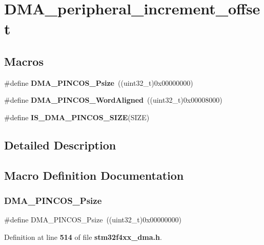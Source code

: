 \section{D\+M\+A\+\_\+peripheral\+\_\+increment\+\_\+offset}
\label{group__DMA__peripheral__increment__offset}
\subsection*{Macros}
\begin{DoxyCompactItemize}
\item 
\#define \textbf{ D\+M\+A\+\_\+\+P\+I\+N\+C\+O\+S\+\_\+\+Psize}~((uint32\+\_\+t)0x00000000)
\item 
\#define \textbf{ D\+M\+A\+\_\+\+P\+I\+N\+C\+O\+S\+\_\+\+Word\+Aligned}~((uint32\+\_\+t)0x00008000)
\item 
\#define \textbf{ I\+S\+\_\+\+D\+M\+A\+\_\+\+P\+I\+N\+C\+O\+S\+\_\+\+S\+I\+ZE}(S\+I\+ZE)
\end{DoxyCompactItemize}


\subsection{Detailed Description}


\subsection{Macro Definition Documentation}
\mbox{\label{group__DMA__peripheral__increment__offset_ga939053c42e486b82963b8eecc809bce0}} 
\subsubsection{D\+M\+A\+\_\+\+P\+I\+N\+C\+O\+S\+\_\+\+Psize}
{\footnotesize\ttfamily \#define D\+M\+A\+\_\+\+P\+I\+N\+C\+O\+S\+\_\+\+Psize~((uint32\+\_\+t)0x00000000)}



Definition at line \textbf{ 514} of file \textbf{ stm32f4xx\+\_\+dma.\+h}.

